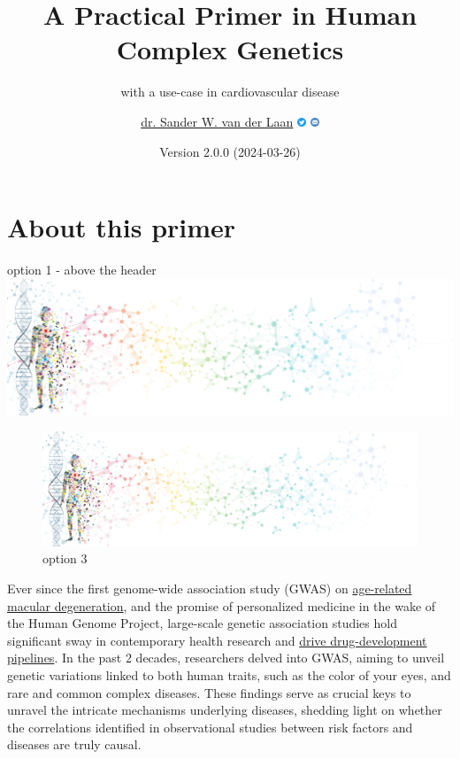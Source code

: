 \documentclass[
]{book}
\title{A Practical Primer in Human Complex Genetics}
\subtitle{with a use-case in cardiovascular disease}
\author{\href{https://vanderlaanand.science}{dr. Sander W. van der Laan} \href{https://www.twitter.com/swvanderlaan}{\includegraphics[width=0.02\textwidth,height=\textheight]{./img/_logo/twitter_circle_blue.png}} \href{mailto:s.w.vanderlaan@gmail.com}{\includegraphics[width=0.02\textwidth,height=\textheight]{./img/_logo/email_circle_blue.png}}}
\date{Version 2.0.0 (2024-03-26)}
\begin{document}
\maketitle

{
\setcounter{tocdepth}{1}
\tableofcontents
}
\hypertarget{about-this-primer}{%
\chapter{About this primer}\label{about-this-primer}}

option 1 - above the header
\includegraphics[width=1\textwidth,height=\textheight]{./img/_headers/banner_man_standing_dna.png}

\begin{figure}
\centering
\includegraphics[width=1\textwidth,height=\textheight]{img/_headers/banner_man_standing_dna.png}
\caption{option 3}
\end{figure}

Ever since the first genome-wide association study (GWAS) on \href{https://doi.org/10.1126/science.1109557}{age-related macular degeneration}, and the promise of personalized medicine in the wake of the Human Genome Project, large-scale genetic association studies hold significant sway in contemporary health research and \href{http://dx.doi.org/10.1038/nrd.2017.262}{drive drug-development pipelines}. In the past 2 decades, researchers delved into GWAS, aiming to unveil genetic variations linked to both human traits, such as the color of your eyes, and rare and common complex diseases. These findings serve as crucial keys to unravel the intricate mechanisms underlying diseases, shedding light on whether the correlations identified in observational studies between risk factors and diseases are truly causal.
\end{document}
